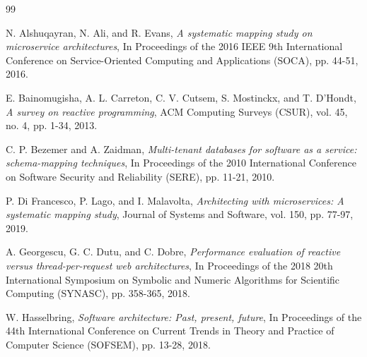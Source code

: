 \begin{thebibliography}{99}

N. Alshuqayran, N. Ali, and R. Evans,
\textit{A systematic mapping study on microservice architectures},
In Proceedings of the 2016 IEEE 9th International Conference on Service-Oriented Computing and Applications (SOCA),
pp. 44-51, 2016.

E. Bainomugisha, A. L. Carreton, C. V. Cutsem, S. Mostinckx, and T. D'Hondt,
\textit{A survey on reactive programming},
ACM Computing Surveys (CSUR),
vol. 45, no. 4, pp. 1-34, 2013.

C. P. Bezemer and A. Zaidman,
\textit{Multi-tenant databases for software as a service: schema-mapping techniques},
In Proceedings of the 2010 International Conference on Software Security and Reliability (SERE),
pp. 11-21, 2010.

P. Di Francesco, P. Lago, and I. Malavolta,
\textit{Architecting with microservices: A systematic mapping study},
Journal of Systems and Software,
vol. 150, pp. 77-97, 2019.

A. Georgescu, G. C. Dutu, and C. Dobre,
\textit{Performance evaluation of reactive versus thread-per-request web architectures},
In Proceedings of the 2018 20th International Symposium on Symbolic and Numeric Algorithms for Scientific Computing (SYNASC),
pp. 358-365, 2018.

W. Hasselbring,
\textit{Software architecture: Past, present, future},
In Proceedings of the 44th International Conference on Current Trends in Theory and Practice of Computer Science (SOFSEM),
pp. 13-28, 2018.

\end{thebibliography}
